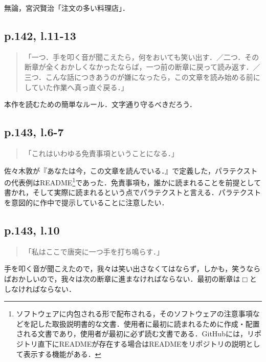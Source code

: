 \documentclass[10pt, a5paper, twoside]{ltjsarticle}
\begin{document}
            無論，宮沢賢治「注文の多い料理店」．

        \subsection{p.142, l.11-13}

            \begin{quote}
                「一つ．手を叩く音が聞こえたら，何をおいても笑い出す．／二つ．その断章が全くおかしくなかったならば，一つ前の断章に戻って読み返す．／三つ．こんな話につきあうのが嫌になったら，この文章を読み始める前にしていた作業へ真っ直ぐ戻る．」
            \end{quote}

            本作を読むための簡単なルール．文字通り守るべきだろう．

        \subsection{p.143, l.6-7}

            \begin{quote}
                「これはいわゆる免責事項ということになる．」
            \end{quote}

            佐々木敦が『あなたは今，この文章を読んでいる．』\cite{sasaki}で定義した，パラテクストの代表例はREADME\footnote{ソフトウェアに内包される形で配布される，そのソフトウェアの注意事項などを記した取扱説明書的な文書．使用者に最初に読まれるために作成・配置される文書であり，使用者が最初に必ず読む文書である．GitHubには，リポジトリ直下にREADMEが存在する場合はREADMEをリポジトリの説明として表示する機能がある．}であった．免責事項も，誰かに読まれることを前提として書かれ，そして実際に読まれるという点でパラテクストと言える．パラテクストを意図的に作中で提示していることに注意したい．

        \subsection{p.143, l.10}

            \begin{quote}
                「私はここで唐突に一つ手を打ち鳴らす．」
            \end{quote}

            手を叩く音が聞こえたので，我々は笑い出さなくてはならず，しかも，笑うならばおかしいので，我々は次の断章に進まなければならない．最初の断章は$\Box$としなければならない．%
\end{document}

